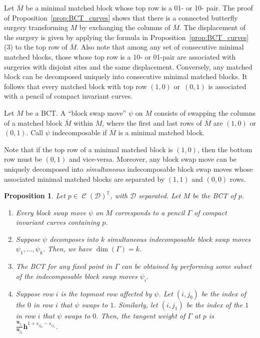 \documentclass[11pt]{article}
\numberwithin{equation}{section}
\newtheorem{Proposition}[Theorem]{Proposition}
 { \theoremstyle{definition}
\newtheorem{Definition}[Theorem]{Definition}
\newtheorem{Note}[Theorem]{Note}
\newtheorem{Example}[Theorem]{Example}
\newtheorem{Remark}[Theorem]{Remark} }
\newcommand{\brane}{\mathcal D}
\newcommand{\torus}{\mathbb T}
\newcommand{\hb}{\mathbf h}
\newcommand{\ub}{\mathbf u}
\DeclareMathOperator{\bowvar}{\mathcal C}
\begin{document}
Let $\overline M$ be a minimal matched block whose top row is a 01- or 10- pair. The proof of Proposition~\ref{prop:BCT_curves} shows that there is a connected butterfly surgery transforming $M$ by exchanging the columns of $\overline M$. The displacement of the surgery is given by applying the formula in Proposition~\ref{prop:BCT_curves}\,(3) to the top row of $\overline M$. Also note that among any set of consecutive minimal matched blocks, those whose top row is a 10- or 01-pair are associated with surgeries with disjoint sites and the same displacement. Conversely, any matched block can be decomposed uniquely into consecutive minimal matched blocks. It follows that every matched block with top row $(1, 0)$ or~$(0, 1)$ is associated with a pencil of compact invariant curves.

\begin{Definition}
Let $M$ be a BCT. A ``block swap move'' $\psi$ on $M$ consists of swapping the columns of a matched block $\overline M$ within $M$, where the first and last rows of $\overline M$ are $(1, 0)$ or $(0, 1)$. Call $\psi$ indecomposable if $\overline M$ is a minimal matched block.
\end{Definition}

Note that if the top row of a minimal matched block is $(1, 0)$, then the bottom row must be $(0, 1)$ and vice-versa. Moreover, any block swap move can be uniquely decomposed into \emph{simultaneous} indecomposable block swap moves whose associated minimal matched blocks are separated by $(1, 1)$ and $(0, 0)$ rows.

\begin{Proposition}
Let $p\in\bowvar(\brane)^\torus$, with $\brane$ separated. Let $M$ be the BCT of $p$.
\begin{enumerate}\itemsep=0pt
\item[$(1)$] Every block swap move $\psi$ on $M$ corresponds to a pencil $\Gamma$ of compact invariant curves containing $p$.
\item[$(2)$] Suppose $\psi$ decomposes into $k$ simultaneous indecomposable block swap moves $\psi_1, \dots , \psi_k$. Then, we have $\dim(\Gamma) = k$.
\item[$(3)$] The BCT for any fixed point in $\Gamma$ can be obtained by performing some subset of the indecomposable block swap moves $\psi_i$.
\item[$(4)$] Suppose row $i$ is the topmost row affected by $\psi$. Let $(i, j_0)$ be the index of the $0$ in row $i$ that $\psi$ swaps to $1$. Similarly, let $(i, j_1)$ be the index of the $1$ in row $i$ that $\psi$ swaps to $0$. Then, the tangent weight of $\Gamma$ at $p$ is $\frac{\ub_{j_1}}{\ub_{j_0}}\hb^{1+s_{i j_0}-s_{i j_1}}$.
\end{enumerate}
\end{Proposition}
\end{document}
